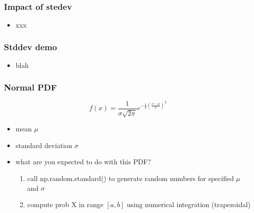 \documentclass[english,14pt]{beamer}
\begin{document}

\begin{frame}[fragile]

\frametitle{Impact of stedev}

\begin{itemize}
	\item xxx
\end{itemize}

\end{frame}


\begin{frame}[fragile]

\frametitle{Stddev demo}


\begin{itemize}
	\item blah
\end{itemize}

\end{frame}


\begin{frame}[fragile]

\frametitle{Normal PDF}

\[
\boxed{
	f(x) = \frac{1}{\sigma\sqrt{2\pi}} e^{-\frac{1}{2}\left(\frac{x-\mu}{\sigma}\right)^2}}
\]

\begin{itemize}
	\item mean $\mu$
	\item standard deviation $\sigma$
	\item what are you expected to do with this PDF?
	\begin{enumerate}
		\item call np.random.standard() to generate random numbers for specified $\mu$ and $\sigma$
		\item compute prob X in range $[a,b]$ using numerical integration (trapezoidal)
	\end{enumerate}
\end{itemize}

\end{frame}
\end{document}
